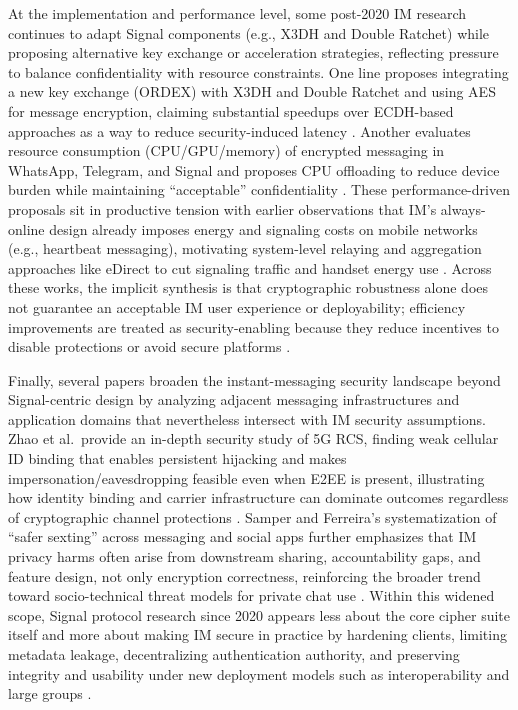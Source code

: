 At the implementation and performance level, some post-2020 IM research continues to adapt Signal components (e.g., X3DH and Double Ratchet) while proposing alternative key exchange or acceleration strategies, reflecting pressure to balance confidentiality with resource constraints. One line proposes integrating a new key exchange (ORDEX) with X3DH and Double Ratchet and using AES for message encryption, claiming substantial speedups over ECDH-based approaches as a way to reduce security-induced latency \cite{m2024}. Another evaluates resource consumption (CPU/GPU/memory) of encrypted messaging in WhatsApp, Telegram, and Signal and proposes CPU offloading to reduce device burden while maintaining “acceptable” confidentiality \cite{thapa2025}. These performance-driven proposals sit in productive tension with earlier observations that IM’s always-online design already imposes energy and signaling costs on mobile networks (e.g., heartbeat messaging), motivating system-level relaying and aggregation approaches like eDirect to cut signaling traffic and handset energy use \cite{yi2020,thapa2025}. Across these works, the implicit synthesis is that cryptographic robustness alone does not guarantee an acceptable IM user experience or deployability; efficiency improvements are treated as security-enabling because they reduce incentives to disable protections or avoid secure platforms \cite{thapa2025,yi2020}.

Finally, several papers broaden the instant-messaging security landscape beyond Signal-centric design by analyzing adjacent messaging infrastructures and application domains that nevertheless intersect with IM security assumptions. Zhao et al.\ provide an in-depth security study of 5G RCS, finding weak cellular ID binding that enables persistent hijacking and makes impersonation/eavesdropping feasible even when E2EE is present, illustrating how identity binding and carrier infrastructure can dominate outcomes regardless of cryptographic channel protections \cite{zhao2022}. Samper and Ferreira’s systematization of “safer sexting” across messaging and social apps further emphasizes that IM privacy harms often arise from downstream sharing, accountability gaps, and feature design, not only encryption correctness, reinforcing the broader trend toward socio-technical threat models for private chat use \cite{samper2025}. Within this widened scope, Signal protocol research since 2020 appears less about the core cipher suite itself and more about making IM secure in practice by hardening clients, limiting metadata leakage, decentralizing authentication authority, and preserving integrity and usability under new deployment models such as interoperability and large groups \cite{nelson2024,morales2024,sarvaiya2025}.

